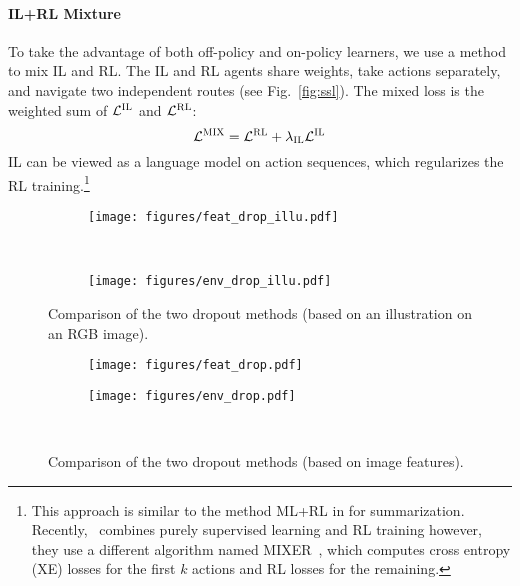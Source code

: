 \documentclass[11pt,a4paper]{article}
\begin{document}
\paragraph{IL+RL Mixture}
To take the advantage of both off-policy and on-policy learners, we use a method to mix IL and RL. 
The IL and RL agents share weights, take actions separately, and navigate two independent routes (see Fig.~\ref{fig:ssl}).
The mixed loss is the weighted sum of $\mathcal{L}^\textsc{IL}$ and $\mathcal{L}^\textsc{RL}$:
\begin{equation}
\mathcal{L}^\textsc{MIX} = \mathcal{L}^\textsc{RL} + \lambda_\textsc{IL} \mathcal{L}^\textsc{IL}
\end{equation}
IL can be viewed as a language model on action sequences, which regularizes the RL training.\footnote{This approach is similar to the method ML+RL in  for summarization. 
Recently,~\citet{wang2018look} combines purely supervised learning and RL training however, they use a different algorithm named MIXER~\cite{ranzato2015sequence}, which computes cross entropy (XE) losses for the first $k$ actions and RL losses for the remaining.}

\begin{figure*}[t]
    \begin{subfigure}[t]{0.48\textwidth}
        \centering
        \texttt{[image: figures/feat\_drop\_illu.pdf]}
        \label{fig:feat_drop_illu}
    \end{subfigure} 
    ~
    \begin{subfigure}[t]{0.48\textwidth}
        \centering
        \texttt{[image: figures/env\_drop\_illu.pdf]}
        \label{fig:env_drop_illu}
    \end{subfigure}
    \vspace{3pt}
    \caption{Comparison of the two dropout methods (based on an illustration on an RGB image).}
\end{figure*}

\begin{figure}[t]
    \centering
    \begin{subfigure}[t]{0.23\textwidth}
        \centering
        \texttt{[image: figures/feat\_drop.pdf]}
        \label{fig:feat_drop_cubic}
    \end{subfigure}\begin{subfigure}[t]{0.23\textwidth}
        \centering
        \texttt{[image: figures/env\_drop.pdf]}
        \label{fig:env_drop_cubic}
    \end{subfigure}\\
    \vspace{4pt}
    \caption{Comparison of the two dropout methods (based on image features).}
    \vspace{-1pt}
\end{figure}
\end{document}
